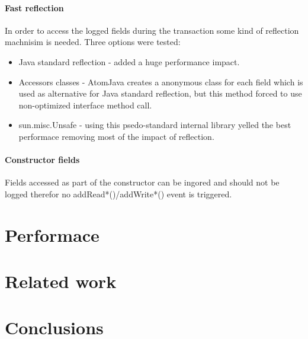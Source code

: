 \documentclass[preprint,natbib,10pt]{sigplanconf}
\begin{document}
\paragraph{Fast reflection} In order to access the logged fields during the transaction some kind of reflection machnisim is needed. Three options were tested:
\begin{itemize}
 \item Java standard reflection - added a huge performance impact.
 \item Accessors classes - AtomJava\cite{1178611} creates a anonymous class for each field which is used as alternative for Java standard reflection, but this method forced to use non-optimized interface method call.
 \item sun.misc.Unsafe - using this psedo-standard internal library yelled the best performace removing most of the impact of reflection.
\end{itemize}
\paragraph{Constructor fields} Fields accessed as part of the constructor can be ingored and should not be logged therefor no addRead*()/addWrite*() event is triggered.

\section{Performace}

\section{Related work}

\section{Conclusions}
\end{document}
